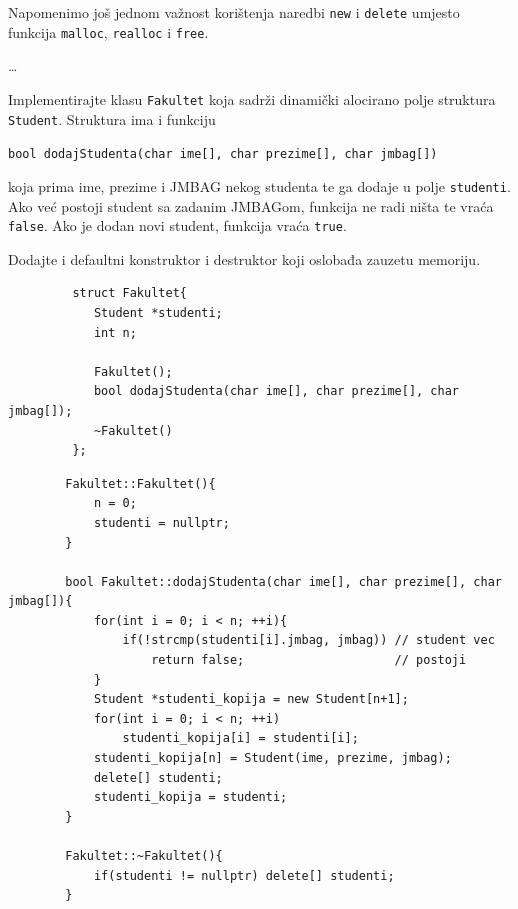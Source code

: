 \begin{napomena}
    Napomenimo još jednom važnost korištenja naredbi \texttt{new} i \texttt{delete} umjesto funkcija \texttt{malloc}, \texttt{realloc} i \texttt{free}.

    \dots
\end{napomena}

\begin{zadatak}
    Implementirajte klasu \texttt{Fakultet} koja sadrži dinamički alocirano polje struktura \texttt{Student}. Struktura ima i funkciju
    \begin{center}
        \texttt{bool dodajStudenta(char ime[], char prezime[], char jmbag[])}
    \end{center}
    koja prima ime, prezime i JMBAG nekog studenta te ga dodaje u polje \texttt{studenti}. Ako već postoji student sa zadanim JMBAGom, funkcija ne radi ništa te vraća \texttt{false}. Ako je dodan novi student, funkcija vraća \texttt{true}.

    Dodajte i defaultni konstruktor i destruktor koji oslobađa zauzetu memoriju.
\end{zadatak}

\begin{rjesenje}
     \begin{verbatim}
         struct Fakultet{
            Student *studenti;
            int n;

            Fakultet();
            bool dodajStudenta(char ime[], char prezime[], char jmbag[]);
            ~Fakultet()
         };
    \end{verbatim}

    \begin{verbatim}
        Fakultet::Fakultet(){
            n = 0;
            studenti = nullptr;
        }

        bool Fakultet::dodajStudenta(char ime[], char prezime[], char jmbag[]){
            for(int i = 0; i < n; ++i){
                if(!strcmp(studenti[i].jmbag, jmbag)) // student vec
                    return false;                     // postoji
            }
            Student *studenti_kopija = new Student[n+1];
            for(int i = 0; i < n; ++i)
                studenti_kopija[i] = studenti[i];
            studenti_kopija[n] = Student(ime, prezime, jmbag);
            delete[] studenti;
            studenti_kopija = studenti;
        }

        Fakultet::~Fakultet(){
            if(studenti != nullptr) delete[] studenti;
        }
    \end{verbatim}
\end{rjesenje}

